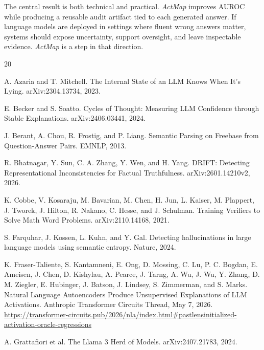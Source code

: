 \documentclass{article}
\newcommand{\actmap}{\textit{ActMap}}
\begin{document}
The central result is both technical and practical. \actmap{} improves AUROC while producing a reusable audit artifact tied to each generated answer. If language models are deployed in settings where fluent wrong answers matter, systems should expose uncertainty, support oversight, and leave inspectable evidence. \actmap{} is a step in that direction.

\begingroup
\footnotesize
\begin{thebibliography}{20}
\raggedright
\setlength{\itemsep}{0pt}
\setlength{\parsep}{0pt}
\setlength{\parskip}{0pt}

A. Azaria and T. Mitchell.
\newblock The Internal State of an LLM Knows When It's Lying.
\newblock arXiv:2304.13734, 2023.

E. Becker and S. Soatto.
\newblock Cycles of Thought: Measuring LLM Confidence through Stable Explanations.
\newblock arXiv:2406.03441, 2024.

J. Berant, A. Chou, R. Frostig, and P. Liang.
\newblock Semantic Parsing on Freebase from Question-Answer Pairs.
\newblock EMNLP, 2013.

R. Bhatnagar, Y. Sun, C. A. Zhang, Y. Wen, and H. Yang.
\newblock DRIFT: Detecting Representational Inconsistencies for Factual Truthfulness.
\newblock arXiv:2601.14210v2, 2026.

K. Cobbe, V. Kosaraju, M. Bavarian, M. Chen, H. Jun, L. Kaiser, M. Plappert, J. Tworek, J. Hilton, R. Nakano, C. Hesse, and J. Schulman.
\newblock Training Verifiers to Solve Math Word Problems.
\newblock arXiv:2110.14168, 2021.

S. Farquhar, J. Kossen, L. Kuhn, and Y. Gal.
\newblock Detecting hallucinations in large language models using semantic entropy.
\newblock Nature, 2024.

K. Fraser-Taliente, S. Kantamneni, E. Ong, D. Mossing, C. Lu, P. C. Bogdan, E. Ameisen, J. Chen, D. Kishylau, A. Pearce, J. Tarng, A. Wu, J. Wu, Y. Zhang, D. M. Ziegler, E. Hubinger, J. Batson, J. Lindsey, S. Zimmerman, and S. Marks.
\newblock Natural Language Autoencoders Produce Unsupervised Explanations of LLM Activations.
\newblock Anthropic Transformer Circuits Thread, May 7, 2026.
\newblock \url{https://transformer-circuits.pub/2026/nla/index.html\#pastlensinitialized-activation-oracle-regressions}

A. Grattafiori et al.
\newblock The Llama 3 Herd of Models.
\newblock arXiv:2407.21783, 2024.


\end{thebibliography}
\end{document}
